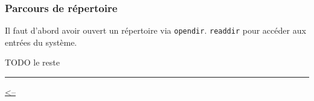 \subsubsection{Parcours de répertoire}\label{parcours-de-ruxe9pertoire}

\begin{Shaded}
\begin{Highlighting}[]
\OperatorTok{\{} 
\OperatorTok{;}                
\OperatorTok{;}                 
     \OperatorTok{;}    
     \OperatorTok{;}       
    \OperatorTok{[}\OperatorTok{];}           
\OperatorTok{\};}
\end{Highlighting}
\end{Shaded}

Il faut d'abord avoir ouvert un répertoire via \texttt{opendir}.
\texttt{readdir} pour accéder aux entrées du système.

TODO le reste

\begin{center}\rule{0.5\linewidth}{0.5pt}\end{center}

\href{../README.md}{\textless--}

